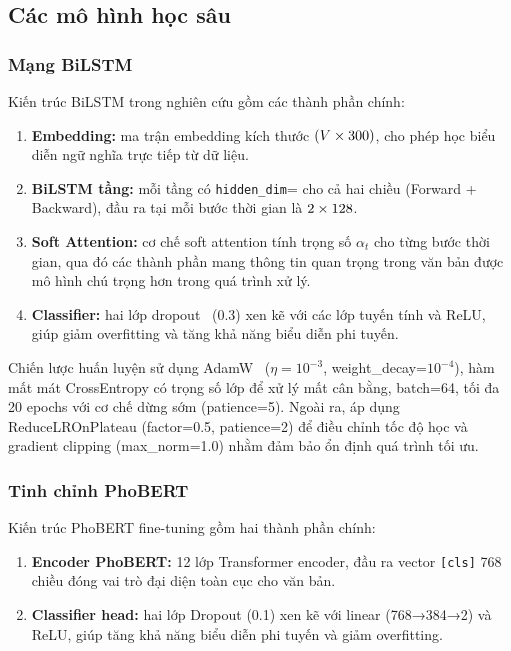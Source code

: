 \subsection{Các mô hình học sâu}

\subsubsection{Mạng BiLSTM}

Kiến trúc BiLSTM trong nghiên cứu gồm các thành phần chính:

\begin{enumerate}[leftmargin=2.5em]
  \item \textbf{Embedding:} ma trận embedding kích thước $(V \times 300)$, cho phép học biểu diễn ngữ nghĩa trực tiếp từ dữ liệu.
  \item \textbf{BiLSTM \bilstmlayers{} tầng:} mỗi tầng có \texttt{hidden\_dim}=\bilstmhiddendim{} cho cả hai chiều (Forward + Backward), đầu ra tại mỗi bước thời gian là $2\times128{}$.
  \item \textbf{Soft Attention:} cơ chế soft attention tính trọng số $\alpha_t$ cho từng bước thời gian, qua đó các thành phần mang thông tin quan trọng trong văn bản được mô hình chú trọng hơn trong quá trình xử lý.
  \item \textbf{Classifier:} hai lớp dropout~\cite{srivastava2014dropout} (0.3) xen kẽ với các lớp tuyến tính và ReLU, giúp giảm overfitting và tăng khả năng biểu diễn phi tuyến.
\end{enumerate}

Chiến lược huấn luyện sử dụng AdamW~\cite{loshchilov2019adamw} ($\eta = 10^{-3}$, weight\_decay=$10^{-4}$), hàm mất mát CrossEntropy có trọng số lớp để xử lý mất cân bằng, batch=64, tối đa 20 epochs với cơ chế dừng sớm (patience=5). Ngoài ra, áp dụng ReduceLROnPlateau (factor=0.5, patience=2) để điều chỉnh tốc độ học và gradient clipping (max\_norm=1.0) nhằm đảm bảo ổn định quá trình tối ưu.

\subsubsection{Tinh chỉnh PhoBERT}

Kiến trúc PhoBERT fine-tuning gồm hai thành phần chính:

\begin{enumerate}[leftmargin=2.5em]
  \item \textbf{Encoder PhoBERT:} 12 lớp Transformer encoder, đầu ra vector \texttt{[cls]} 768 chiều đóng vai trò đại diện toàn cục cho văn bản.
  \item \textbf{Classifier head:} hai lớp Dropout (0.1) xen kẽ với linear (768→384→2) và ReLU, giúp tăng khả năng biểu diễn phi tuyến và giảm overfitting.
\end{enumerate}

